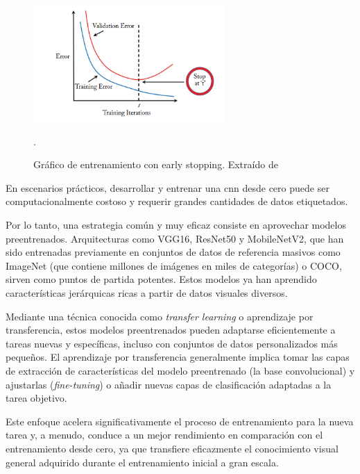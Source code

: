 \documentclass[11pt,spanish,listoffigures,listoftables]{tfgetsinf}
\begin{document}
\begin{figure}[H]
   \centering
   \includegraphics[width=0.65\textwidth]{images/estado_del_arte/early_stopping.png}
   \caption[Gráfico de entrenamiento con early stopping]{Gráfico de entrenamiento con early stopping. Extraído de \cite[fig. 5.2, p. ~79]{khan2018guide}}.
   \label{fig:early_stopping}
\end{figure}




En escenarios prácticos, desarrollar y entrenar una \gls{cnn} desde cero puede ser computacionalmente costoso y requerir grandes cantidades de datos etiquetados.

Por lo tanto, una estrategia común y muy eficaz consiste en aprovechar modelos preentrenados. Arquitecturas como VGG16, ResNet50 y MobileNetV2, que han sido entrenadas previamente en conjuntos de datos de referencia masivos como ImageNet\cite{ImageNet} (que contiene millones de imágenes en miles de categorías) o COCO\cite{lin2015microsoftcococommonobjects}, sirven como puntos de partida potentes. Estos modelos ya han aprendido características jerárquicas ricas a partir de datos visuales diversos.

Mediante una técnica conocida como \textit{transfer learning} o aprendizaje por transferencia, estos modelos preentrenados pueden adaptarse eficientemente a tareas nuevas y específicas, incluso con conjuntos de datos personalizados más pequeños. El aprendizaje por transferencia generalmente implica tomar las capas de extracción de características del modelo preentrenado (la base convolucional) y ajustarlas (\textit{fine-tuning}) o añadir nuevas capas de clasificación adaptadas a la tarea objetivo.

Este enfoque acelera significativamente el proceso de entrenamiento para la nueva tarea y, a menudo, conduce a un mejor rendimiento en comparación con el entrenamiento desde cero, ya que transfiere eficazmente el conocimiento visual general adquirido durante el entrenamiento inicial a gran escala.
\end{document}
